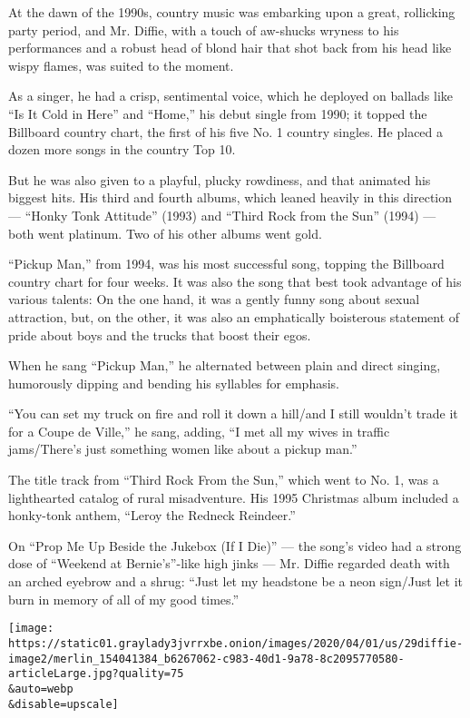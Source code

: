 At the dawn of the 1990s, country music was embarking upon a great,
rollicking party period, and Mr. Diffie, with a touch of aw-shucks
wryness to his performances and a robust head of blond hair that shot
back from his head like wispy flames, was suited to the moment.

As a singer, he had a crisp, sentimental voice, which he deployed on
ballads like ``Is It Cold in Here'' and ``Home,'' his debut single from
1990; it topped the Billboard country chart, the first of his five No. 1
country singles. He placed a dozen more songs in the country Top 10.

But he was also given to a playful, plucky rowdiness, and that animated
his biggest hits. His third and fourth albums, which leaned heavily in
this direction --- ``Honky Tonk Attitude'' (1993) and ``Third Rock from
the Sun'' (1994) --- both went platinum. Two of his other albums went
gold.

``Pickup Man,'' from 1994, was his most successful song, topping the
Billboard country chart for four weeks. It was also the song that best
took advantage of his various talents: On the one hand, it was a gently
funny song about sexual attraction, but, on the other, it was also an
emphatically boisterous statement of pride about boys and the trucks
that boost their egos.

When he sang ``Pickup Man,'' he alternated between plain and direct
singing, humorously dipping and bending his syllables for emphasis.

``You can set my truck on fire and roll it down a hill/and I still
wouldn't trade it for a Coupe de Ville,'' he sang, adding, ``I met all
my wives in traffic jams/There's just something women like about a
pickup man.''

The title track from ``Third Rock From the Sun,'' which went to No. 1,
was a lighthearted catalog of rural misadventure. His 1995 Christmas
album included a honky-tonk anthem, ``Leroy the Redneck Reindeer.''

On ``Prop Me Up Beside the Jukebox (If I Die)'' --- the song's video had
a strong dose of ``Weekend at Bernie's''-like high jinks --- Mr. Diffie
regarded death with an arched eyebrow and a shrug: ``Just let my
headstone be a neon sign/Just let it burn in memory of all of my good
times.''

\texttt{[image: https://static01.graylady3jvrrxbe.onion/images/2020/04/01/us/29diffie-image2/merlin\_154041384\_b6267062-c983-40d1-9a78-8c2095770580-articleLarge.jpg?quality=75\\\&auto=webp\\\&disable=upscale]}

